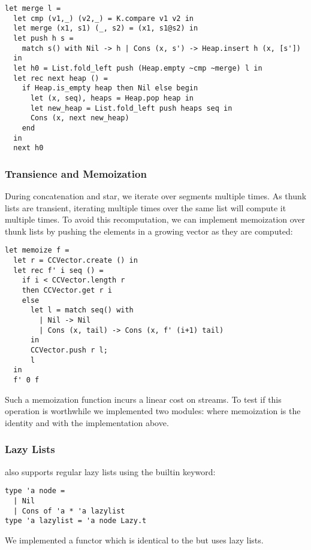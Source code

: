 \begin{lstlisting}
let merge l =
  let cmp (v1,_) (v2,_) = K.compare v1 v2 in
  let merge (x1, s1) (_, s2) = (x1, s1@s2) in
  let push h s =
    match s() with Nil -> h | Cons (x, s') -> Heap.insert h (x, [s'])
  in
  let h0 = List.fold_left push (Heap.empty ~cmp ~merge) l in
  let rec next heap () =
    if Heap.is_empty heap then Nil else begin
      let (x, seq), heaps = Heap.pop heap in
      let new_heap = List.fold_left push heaps seq in
      Cons (x, next new_heap)
    end
  in
  next h0
\end{lstlisting}

\subsubsection{Transience and Memoization}

During concatenation and star, we iterate over segments multiple times.
As thunk lists are transient, iterating multiple times over the same list
will compute it multiple times. To avoid this recomputation, we can implement memoization
over thunk lists by pushing the elements in a growing vector as they are
computed:
\begin{lstlisting}
let memoize f =
  let r = CCVector.create () in
  let rec f' i seq () =
    if i < CCVector.length r
    then CCVector.get r i
    else 
      let l = match seq() with
        | Nil -> Nil
        | Cons (x, tail) -> Cons (x, f' (i+1) tail)
      in
      CCVector.push r l;
      l
  in
  f' 0 f
\end{lstlisting}

Such a memoization function incurs a linear cost on streams. To test
if this operation is worthwhile we implemented two modules:
 where memoization is the identity and 
with the implementation above.

\subsubsection{Lazy Lists}

\ocaml also supports regular lazy lists using the builtin  keyword:

\begin{lstlisting}
type 'a node =
  | Nil
  | Cons of 'a * 'a lazylist
type 'a lazylist = 'a node Lazy.t
\end{lstlisting}

We implemented a  functor which is identical to the
 but uses lazy lists.

